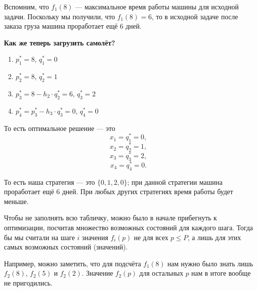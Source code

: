 \begin{enumerate}
	Вспомним, что $f_1(8)$ --- максимальное время работы машины для исходной задачи. Поскольку мы получили, что $f_1(8) = 6$, то в исходной задаче после заказа груза машина проработает ещё 6 дней.
	
	\textbf{Как же теперь загрузить самолёт?}
	
	\begin{enumerate}
		\item $p_1^* = 8$, $q_1^* = 0$
		
		\item $p_2^* = 8$, $q_2^* = 1$
		
		\item $p_3^* = 8 - h_2 \cdot q_2^* = 6$, $q_3^* = 2$
		
		\item $p_4^* = p_3^* - h_3 \cdot q_3^* = 0$, $q_4^* = 0$
	\end{enumerate}
	
	То есть оптимальное решение --- это
	\[
	x_1 = q_1^* = 0,
	\]
	\[
	x_2 = q_2^* = 1,
	\]
	\[
	x_3 = q_3^* = 2,
	\]
	\[
	x_4 = q_4^* = 0.
	\]
	
	То есть наша стратегия --- это $\{0, 1, 2, 0\}$; при данной стратегии машина проработает ещё 6 дней. При любых других стратегиях время работы будет меньше.
\end{enumerate}

\remark

Чтобы не заполнять всю табличку, можно было в начале прибегнуть к оптимизации, посчитав множество возможных состояний для каждого шага. Тогда бы мы считали на шаге $i$ значения $f_i(p)$ не для всех $p \le P$, а лишь для этих самых возможных состояний (значений).

Например, можно заметить, что для подсчёта $f_1(8)$ нам нужно было знать лишь $f_2(8)$, $f_2(5)$ и $f_2(2)$. Значение $f_2(p)$ для остальных $p$ нам в итоге вообще не пригодились.
